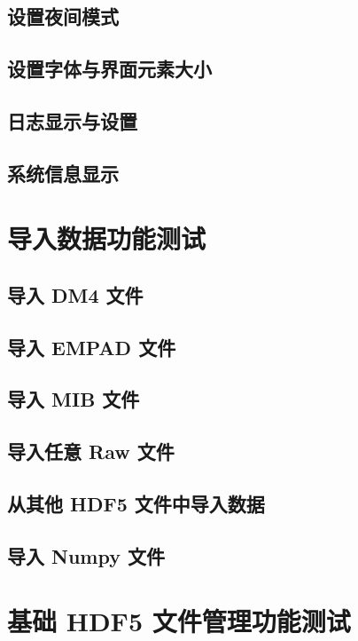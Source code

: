 \documentclass[a4paper,12pt]{report}	%
\begin{document}
\subsection{设置夜间模式}

\subsection{设置字体与界面元素大小}

\subsection{日志显示与设置}

\subsection{系统信息显示}

\section{导入数据功能测试}

\subsection{导入 DM4 文件}

\subsection{导入 EMPAD 文件}

\subsection{导入 MIB 文件}

\subsection{导入任意 Raw 文件}

\subsection{从其他 HDF5 文件中导入数据}

\subsection{导入 Numpy 文件}


\section{基础 HDF5 文件管理功能测试}
\end{document}
